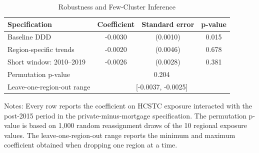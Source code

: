 \begin{table}[H]
\centering
\caption{Robustness and Few-Cluster Inference}
\begin{threeparttable}
\begin{tabular}{lccc}
\toprule
Specification & Coefficient & Standard error & p-value \\
\midrule
Baseline DDD & -0.0030\sym{**} & (0.0010) & 0.015 \\
Region-specific trends & -0.0020 & (0.0046) & 0.678 \\
Short window: 2010--2019 & -0.0026 & (0.0028) & 0.381 \\
\midrule
Permutation p-value & \multicolumn{3}{c}{0.204} \\
Leave-one-region-out range & \multicolumn{3}{c}{[-0.0037, -0.0025]} \\
\bottomrule
\end{tabular}
\begin{flushleft}
\small Notes: Every row reports the coefficient on HCSTC exposure interacted with the post-2015 period in the private-minus-mortgage specification. The permutation p-value is based on 1,000 random reassignment draws of the 10 regional exposure values. The leave-one-region-out range reports the minimum and maximum coefficient obtained when dropping one region at a time.
\end{flushleft}
\end{threeparttable}
\label{tab:robustness}
\end{table}
